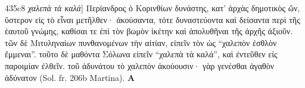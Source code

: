\documentclass[11pt,a4paper]{book}
\newcounter{para}[chapter]\setcounter{para}{0}
\newcommand{\newpara}{%
    \refstepcounter{para}}
\begin{document}
\beginnumbering

\setcounter{pstart}{1}
\numberpstarttrue

    \setcounter{pstart}{41}
    \pstart\newpara \label{itm:Riv41}435c8 \textit{χαλεπὰ τὰ καλά}] Περίανδρος ὁ Κορινθίων δυνάστης, κατ’ ἀρχὰς δημοτικὸς ὤν, ὕστερον εἰς τὸ  εἶναι μετῆλθεν·   ἀκούσαντα, τότε  δυναστεύοντα καὶ δείσαντα περὶ τῆς ἑαυτοῦ γνώμης, καθίσαι τε ἐπὶ τὸν βωμὸν ἱκέτην καὶ ἀπολυθῆναι τῆς ἀρχῆς ἀξιοῦν. τῶν δὲ Μιτυληναίων πυνθανομένων τὴν αἰτίαν, εἰπεῖν τὸν  ὡς “χαλεπὸν ἐσθλὸν ἔμμεναι”. τοῦτο δὲ μαθόντα Σόλωνα εἰπεῖν “χαλεπὰ τὰ καλά”, καὶ ἐντεῦθεν εἰς παροιμίαν ἐλθεῖν.  τοῦ ἀδυνάτου τὸ χαλεπὸν ἀκούουσιν·  γὰρ γενέσθαι ἀγαθὸν ἀδύνατον (Sol. fr. 206b Martina). \textbf{A}\pend

\numberpstartfalse
\endnumbering
\end{document}
